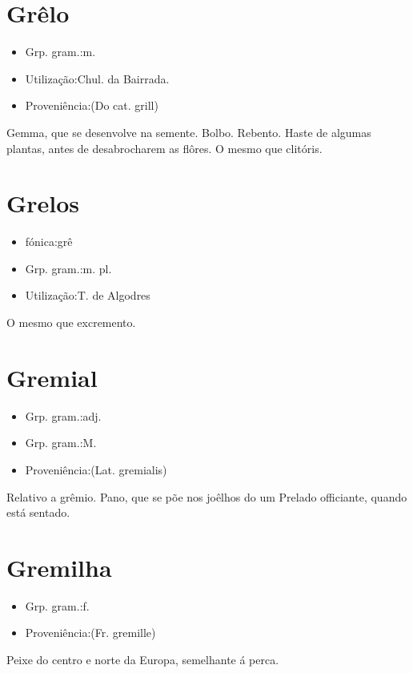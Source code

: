 \section{Grêlo}
\begin{itemize}
\item {Grp. gram.:m.}
\end{itemize}
\begin{itemize}
\item {Utilização:Chul. da Bairrada.}
\end{itemize}
\begin{itemize}
\item {Proveniência:(Do cat. \textunderscore grill\textunderscore )}
\end{itemize}
Gemma, que se desenvolve na semente.
Bolbo.
Rebento.
Haste de algumas plantas, antes de desabrocharem as flôres.
O mesmo que \textunderscore clitóris\textunderscore .
\section{Grelos}
\begin{itemize}
\item {fónica:grê}
\end{itemize}
\begin{itemize}
\item {Grp. gram.:m. pl.}
\end{itemize}
\begin{itemize}
\item {Utilização:T. de Algodres}
\end{itemize}
O mesmo que \textunderscore excremento\textunderscore .
\section{Gremial}
\begin{itemize}
\item {Grp. gram.:adj.}
\end{itemize}
\begin{itemize}
\item {Grp. gram.:M.}
\end{itemize}
\begin{itemize}
\item {Proveniência:(Lat. \textunderscore gremialis\textunderscore )}
\end{itemize}
Relativo a grêmio.
Pano, que se põe nos joêlhos do um Prelado officiante, quando está sentado.
\section{Gremilha}
\begin{itemize}
\item {Grp. gram.:f.}
\end{itemize}
\begin{itemize}
\item {Proveniência:(Fr. \textunderscore gremille\textunderscore )}
\end{itemize}
Peixe do centro e norte da Europa, semelhante á perca.
